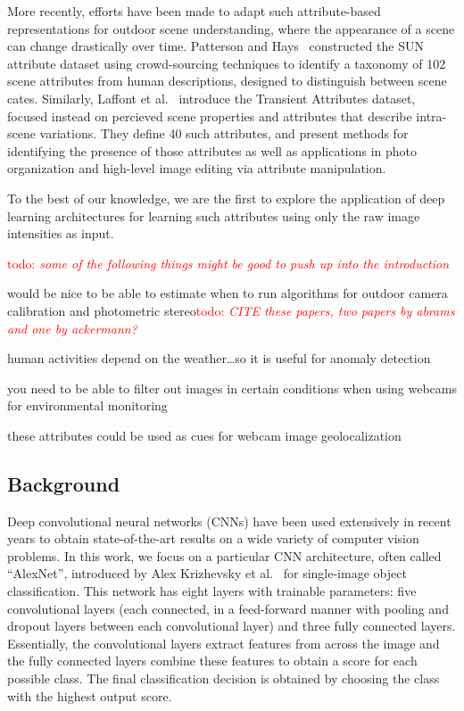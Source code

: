 \documentclass{article}
\newcommand{\todo}[1]{\textcolor{red}{todo: {\em #1}}}
\begin{document}
More recently, efforts have been made to adapt such attribute-based
representations for outdoor scene understanding, where the appearance
of a scene can change drastically over time.  Patterson and
Hays~\cite{patterson2012sun} constructed the SUN attribute dataset
using crowd-sourcing techniques to identify a taxonomy of 102 scene
attributes from human descriptions, designed to distinguish between
scene cates. Similarly, Laffont et al.~\cite{Laffont14} introduce the
Transient Attributes dataset, focused instead on percieved scene
properties and attributes that describe intra-scene variations. They
define 40 such attributes, and present methods for identifying the
presence of those attributes as well as applications in photo
organization and high-level image editing via attribute manipulation. 

To the best of our knowledge, we are the first to explore the
application of deep learning architectures for learning such
attributes using only the raw image intensities as input.

\todo{some of the following things might be good to push up into the
introduction}

would be nice to be able to estimate when to run algorithms for
outdoor camera
calibration\cite{jacobs13cloudcalibration,workman2014rainbow} and
photometric stereo\todo{CITE these papers, two papers by abrams and
one by ackermann?}

human activities depend on the weather\dots so it is useful for
anomaly detection~\cite{abrams12lost}

you need to be able to filter out images in certain conditions when
using webcams for environmental monitoring~\cite{jacobs09webcamgis}

these attributes could be used as cues for webcam image
geolocalization~\cite{jacobs07geolocate}


\subsection{Background}

Deep convolutional neural networks (CNNs) have been used extensively
in recent years to obtain state-of-the-art results on a wide variety
of computer vision problems.  In this work, we focus on a particular
CNN architecture, often called ``AlexNet'', introduced by Alex
Krizhevsky et al.~\cite{caffenetnips12} for single-image object
classification. This network has eight layers with trainable
parameters: five convolutional layers (each connected, in a
feed-forward manner with pooling and dropout layers between each
convolutional layer) and three fully connected layers. Essentially,
the convolutional layers extract features from across the image and
the fully connected layers combine these features to obtain a score
for each possible class. The final classification decision is obtained
by choosing the class with the highest output score.
\end{document}
